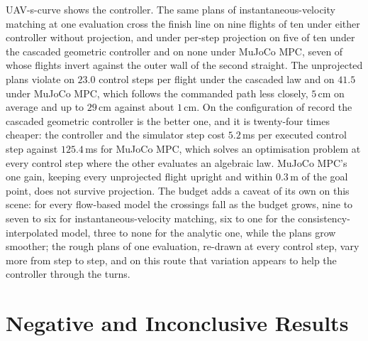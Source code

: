 UAV-s-curve shows the controller. The same plans of instantaneous-velocity matching at one evaluation
cross the finish line on nine flights of ten under either controller without projection, and under
per-step projection on five of ten under the cascaded geometric controller and on none under MuJoCo
MPC, seven of whose flights invert against the outer wall of the second straight. The unprojected plans
violate on $23.0$ control steps per flight under the cascaded law and on $41.5$ under MuJoCo MPC, which
follows the commanded path less closely, $5$\,cm on average and up to $29$\,cm against about $1$\,cm. On
the configuration of record the cascaded geometric controller is the better one, and it is twenty-four
times cheaper: the controller and the simulator step cost $5.2$\,ms per executed control step against
$125.4$\,ms for MuJoCo MPC, which solves an optimisation problem at every control step where the other
evaluates an algebraic law. MuJoCo MPC's one gain, keeping every unprojected flight upright and within
$0.3$\,m of the goal point, does not survive projection. The budget adds a caveat of its own on this
scene: for every flow-based model the crossings fall as the budget grows, nine to seven to six for
instantaneous-velocity matching, six to one for the consistency-interpolated model, three to none for
the analytic one, while the plans grow smoother; the rough plans of one evaluation, re-drawn at every
control step, vary more from step to step, and on this route that variation appears to help the
controller through the turns.

\section{Negative and Inconclusive Results}\label{sec:disc:negative}

